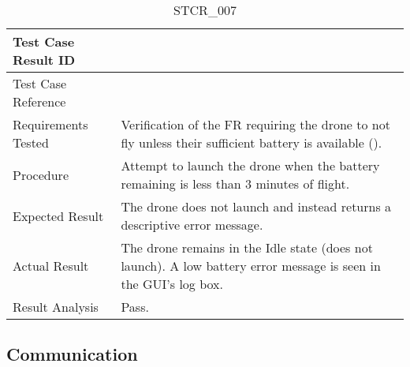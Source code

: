 \documentclass[12pt, titlepage]{article}
\begin{document}
\begin{table}[!h]
\begin{center}
\caption {STCR\_007}
\label{tab:STCR_007}
\begin{tabular}{ | m{3.2cm} | m{12.2cm} | } 
\hline
Test Case Result ID & \nameref{tab:STCR_007} \\ 
\hline
Test Case Reference & \nameref{tab:STC_007}  \\ 
\hline
Requirements Tested & Verification of the FR requiring the drone to not fly unless their sufficient battery is available (\nameref{SR_012}). \\ 
\hline
Procedure & Attempt to launch the drone when the battery remaining is less than 3 minutes of flight.  \\ 
\hline
Expected Result & The drone does not launch and instead returns a descriptive error message.   \\ 
\hline
Actual Result & The drone remains in the Idle state (does not launch). A low battery error message is seen in the GUI's log box.  \\
\hline
Result Analysis & Pass. \\ 
\hline
\end{tabular}
\end{center}
\end{table}

\clearpage

\subsection{Communication}
\end{document}
